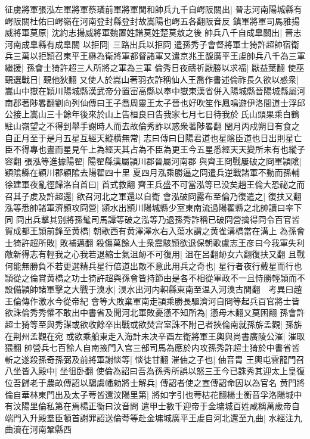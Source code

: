 征虜將軍張泓左軍將軍蔡璜前軍將軍閭和帥兵九千自崿阪關出|{
	晉志河南陽城縣有崿阪關杜佑曰崿嶺在河南登封縣登封故嵩陽也崿五各翻阪音反}
鎮軍將軍司馬雅揚威將軍莫原|{
	沈約志揚威將軍魏置姓譜莫姓楚莫敖之後}
帥兵八千自成臯關出|{
	晉志河南成臯縣有成臯關}
以拒冏|{
	三路出兵以拒冏}
遣孫秀子會督將軍士猗許超帥宿衛兵三萬以拒頴召東平王楙為衛將軍都督諸軍又遣京兆王馥廣平王䖍帥兵八千為三軍繼援|{
	孫會士猗許超三人所將之軍為三軍}
倫秀日夜禱祈厭勝以求福|{
	厭益葉翻}
使巫覡選戰日|{
	覡他狄翻}
又使人於嵩山著羽衣詐稱仙人王喬作書述倫祚長久欲以惑衆|{
	嵩山中嶽在穎川陽城縣漢武帝分置崈高縣以奉中嶽東漢省併入陽城縣晉陽城縣屬河南郡著陟畧翻劉向列仙傳曰王子喬周靈王太子晉也好吹笙作鳳鳴遊伊洛間道士浮邱公接上嵩山三十餘年後來於山上告桓良曰告我家七月七日待我於氏山頭果乘白鶴駐山嶺望之不得到舉手謝時人而去故倫秀詐以惑衆著陟畧翻}
閏月丙戍朔日有食之自正月至于是月五星互經天縱横無常|{
	志曰傳曰日陽君道也星隂臣道也日出則星亡臣不得專也晝而星見午上為經天其占為不臣為更王今五星悉經天天變所未有也縱子容翻}
張泓等進據陽翟|{
	陽翟縣漢屬頴川郡晉屬河南郡}
與齊王冏戰屢破之冏軍頴隂|{
	穎隂縣在穎川郡穎隂去陽翟四十里}
夏四月泓乘勝逼之冏遣兵逆戰諸軍不動而孫輔徐建軍夜亂徑歸洛自首曰|{
	首式救翻}
齊王兵盛不可當泓等已没矣趙王倫大恐祕之而召其子䖍及許超還|{
	欲召河北之軍還以自衛}
會泓破冏露布至倫乃復遣之|{
	復扶又翻}
泓等悉帥諸軍濟頴攻冏營|{
	潁水出頴川陽城縣少室東南流過陽翟縣之北帥讀曰率下同}
冏出兵擊其别將孫髦司馬譚等破之泓等乃退孫秀詐稱已破冏營擒得冏令百官皆賀成都王頴前鋒至黄橋|{
	朝歌西有黄澤澤水右入蕩水謂之黄雀溝橋當在溝上}
為孫會士猗許超所敗|{
	敗補邁翻}
殺傷萬餘人士衆震駭頴欲退保朝歌盧志王彦曰今我軍失利敵新得志有輕我之心我若退縮士氣沮䘐不可復用|{
	沮在呂翻䘐女六翻復扶又翻}
且戰何能無勝負不若更選精兵星行倍道出敵不意此用兵之奇也|{
	星行者夜行戴星而行也}
頴從之倫賞黄橋之功士猗許超與孫會皆持節由是各不相從軍政不一且恃勝輕頴而不設備頴帥諸軍擊之大戰于溴水|{
	湨水出河内軹縣東南至温入河溴古閴翻　考異曰趙王倫傳作激水今從帝紀}
會等大敗棄軍南走頴乘勝長驅濟河自冏等起兵百官將士皆欲誅倫秀秀懼不敢出中書省及聞河北軍敗憂懣不知所為|{
	懣母木翻又莫困翻}
孫會許超士猗等至與秀謀或欲收餘卒出戰或欲焚宫室誅不附己者挾倫南就孫旂孟觀|{
	孫旂在荆州孟觀在宛}
或欲乘船東走入海計未决辛酉左衛將軍王輿與尚書廣陵公漼|{
	漼取猥翻}
帥營兵七百餘人自南掖門入宫三部司馬為應於内攻孫秀許超士猗於中書省皆斬之遂殺孫奇孫弼及前將軍謝惔等|{
	惔徒甘翻}
漼伷之子也|{
	伷音胄}
王輿屯雲龍門召八坐皆入殿中|{
	坐徂卧翻}
使倫為詔曰吾為孫秀所誤以怒三王今已誅秀其迎太上皇復位吾歸老于農畝傳詔以騶虞幡勑將士解兵|{
	傳詔者使之宣傳詔命因以為官名}
黄門將倫自華林東門出及太子荂皆還汶陽里第|{
	將如字引也荂枯花翻楊士衡音孚洛陽城中有汶陽里倫私第在焉楊正衡曰汶音問}
遣甲士數千迎帝于金墉城百姓咸稱萬歲帝自端門入升殿羣臣頓首謝罪詔送倫荂等赴金墉城廣平王䖍自河北還至九曲|{
	水經注九曲瀆在河南鞏縣西}
